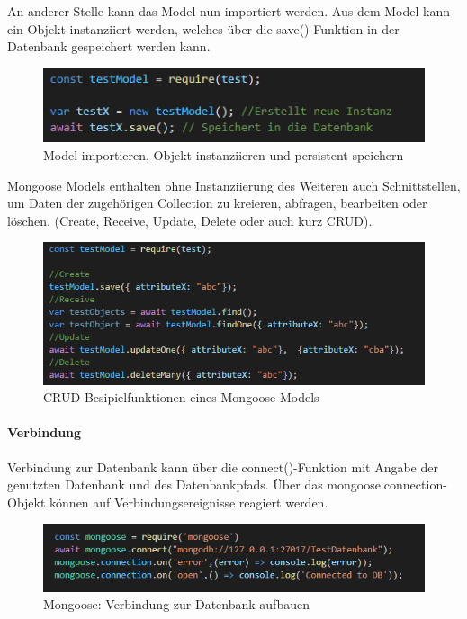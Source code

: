 An anderer Stelle kann das Model nun importiert werden. Aus dem Model kann ein Objekt instanziiert werden, welches über die save()-Funktion in der Datenbank gespeichert werden kann.

\begin{figure}[h]
\centering
\includegraphics{images/nodeJS_mongooseModellimport.PNG}
\caption{Model importieren, Objekt instanziieren und persistent speichern}
\end{figure}

Mongoose Models enthalten ohne Instanziierung des Weiteren auch Schnittstellen, um Daten der zugehörigen Collection zu kreieren, abfragen, bearbeiten oder löschen. (Create, Receive, Update, Delete oder auch kurz CRUD).
\newline
\newpage
\begin{figure}[h]
\centering
\includegraphics{images/nodeJS_mongooseModellCRUD.PNG}
\caption{CRUD-Besipielfunktionen eines Mongoose-Models}
\end{figure}

\paragraph{Verbindung}
Verbindung zur Datenbank kann über die connect()-Funktion mit Angabe der genutzten Datenbank und des Datenbankpfads. Über das mongoose.connection-Objekt können auf Verbindungsereignisse reagiert werden. 
\newline


\begin{figure}[h]
\centering
\includegraphics{images/nodeJS_mongooseVerbindung.PNG}
\caption{Mongoose: Verbindung zur Datenbank aufbauen}
\end{figure}

